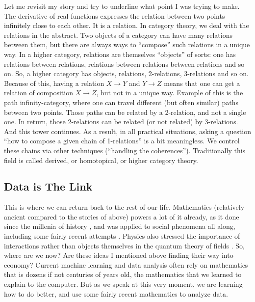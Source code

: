 \documentclass{article}
\begin{document}
Let me revisit my story and try to underline what point I was trying to make. The  derivative of real functions expresses the relation between two points infinitely close to each other. It is a relation. In category theory, we deal with the relations in the abstract. Two objects of a category can have many relations between them, but there are always ways to “compose” such relations in a unique way.
In a higher category, relations are themselves “objects” of sorts: one has relations between relations, relations between relations between relations and so on.
So, a higher category has objects, relations, 2-relations, 3-relations and so on.
Because of this, having a relation  $X \to Y$ and $Y \to Z$ means that one can get a relation of composition $X \to Z$, but not in a unique way. Example of this is the path infinity-category, where one can travel different (but often similar) paths between two points. Those paths can be related by a 2-relation, and not a single one. In return, those 2-relations can be related (or not related) by 3-relations. And this tower continues.
As a result, in all practical situations, asking a question “how to compose a given chain of 1-relations” is a bit meaningless. We control these chains via other techniques (“handling the coherences”). Traditionally this field is called derived, or homotopical, or higher category theory.

\subsection*{Data is The Link}

This is where we can return back to the rest of our life. Mathematics (relatively ancient compared to the stories of above) powers a lot of it already, as it done since the millenia of history \cite{CHILDE}, and was applied to social phenomena all along, including some fairly recent attempts \cite{MORAVA}. Physics also stressed the importance of interactions rather than objects themselves in the quantum theory of fields \cite{WEINBERG}. So, where are we now? Are these ideas I mentioned above finding their way into economy?
Current machine learning and data analysis often rely on mathematics that is dozens if not centuries of years old, the mathematics that we learned to explain to the computer. But as we speak at this very moment, we are learning how to do better, and use some fairly recent mathematics to analyze data.
\end{document}
